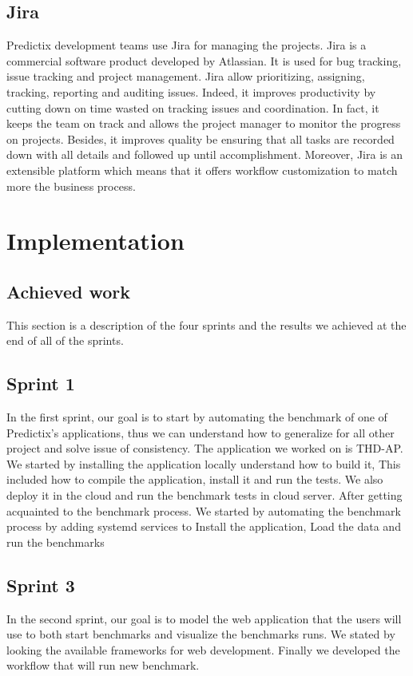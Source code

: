 \subsection{Jira}
Predictix development teams use Jira for managing the projects. Jira is a
commercial software product developed by Atlassian. It is used for bug tracking,
issue tracking and project management. Jira allow prioritizing, assigning,
tracking, reporting and auditing issues. Indeed, it improves productivity by
cutting down on time wasted on tracking issues and coordination. In fact, it
keeps the team on track and allows the project manager to monitor the progress
on projects. Besides, it improves quality be ensuring that all tasks are
recorded down with all details and followed up until accomplishment. Moreover,
Jira is an extensible platform which means that it offers workflow customization
to match more the business process. \cite{jira}


\section{Implementation}
\subsection{Achieved work}
This section is a description of the four sprints and the results we achieved at
the end of all of the sprints.
\subsection{Sprint 1}
In the first sprint, our goal is to start by automating the benchmark of one of
Predictix's applications, thus we can understand how to generalize for all other
project and solve issue of consistency. The application we worked on is THD-AP.
We started by installing the application locally understand how to build it,
This included how to compile the application, install it and run the tests.
We also deploy it in the cloud and run the benchmark tests in cloud server.
After getting acquainted to the benchmark process. We started by automating the
benchmark process by adding systemd services to Install the application, Load
the data and run the benchmarks


\subsection{Sprint 3}
In the second sprint, our goal is to model the web application that the users
will use to both start benchmarks and visualize the benchmarks runs. We stated
by looking the available frameworks for web development. Finally we developed
the workflow that will run new benchmark.

